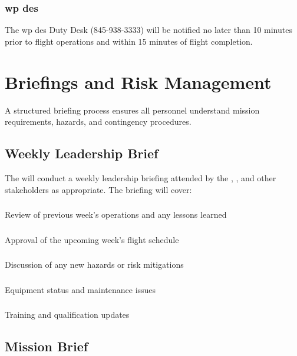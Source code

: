         \subsubsection{\ac{wp} \ac{des}} The \ac{wp} \ac{des} Duty Desk (845-938-3333) will be notified no later than 10 minutes prior to flight operations and within 15 minutes of flight completion.

\section{Briefings and Risk Management}\label{sec:Briefings}

A structured briefing process ensures all personnel understand mission requirements, hazards, and contingency procedures.

    \subsection{Weekly Leadership Brief}\label{ssec:weeklyleadershipbrief}

        The  will conduct a weekly leadership briefing attended by the , , and other stakeholders as appropriate. The briefing will cover:

        \subsubsection{} Review of previous week's operations and any lessons learned
        \subsubsection{} Approval of the upcoming week's flight schedule
        \subsubsection{} Discussion of any new hazards or risk mitigations
        \subsubsection{} Equipment status and maintenance issues
        \subsubsection{} Training and qualification updates

    \subsection{Mission Brief}\label{ssec:missionbrief}

